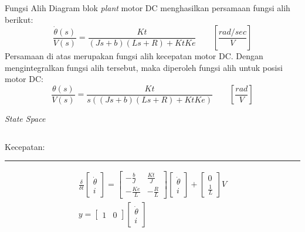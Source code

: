 \documentclass[10pt,xcolor={dvipsnames}]{beamer}
\begin{document}
		\begin{frame}{Fungsi Alih}
			Diagram blok \textit{plant} motor DC menghasilkan persamaan fungsi alih berikut:
			\begin{equation}
				\frac{\dot{\theta}(s)}{V(s)}=\frac{Kt}{(Js+b)(Ls+R)+KtKe} \qquad \left[\frac{rad/sec}{V}\right] 
			\end{equation} 
			Persamaan di atas merupakan fungsi alih kecepatan motor DC. Dengan mengintegralkan fungsi alih tersebut, maka diperoleh fungsi alih untuk posisi motor DC:
			\begin{equation}
				\frac{\theta(s)}{V(s)}=\frac{Kt}{s((Js+b)(Ls+R)+KtKe)} \qquad \left[\frac{rad}{V}\right]
				\label{position}
			\end{equation}
		\end{frame}
		
		\begin{frame}{\textit{State Space}}
			\begin{columns}[T]
				\begin{column}{0.5\textwidth}
					Kecepatan:
					\color{black}\rule{\linewidth}{4pt}
					\begin{equation}
						\begin{split}
							\frac{\delta}{\delta t}
							\begin{bmatrix}
								\dot{\theta} \\ i
							\end{bmatrix}
							=
							\begin{bmatrix}
								-\frac{b}{J} & \frac{Kt}{J}\\
								-\frac{Ke}{L} & -\frac{R}{L}
							\end{bmatrix}
							\begin{bmatrix}
								\dot{\theta} \\ i
							\end{bmatrix}
							+
							\begin{bmatrix}
								0 \\ \frac{1}{L}
							\end{bmatrix}
							V\\
							y=
							\begin{bmatrix}
								1 & 0
							\end{bmatrix}
							\begin{bmatrix}
								\dot{\theta} \\ i
							\end{bmatrix}
						\end{split}
					\end{equation}

\end{column}
\end{columns}
\end{frame}
\end{document}
